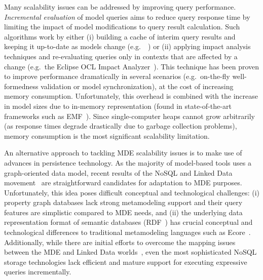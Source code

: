 Many scalability issues can be addressed by improving query performance. \emph{Incremental evaluation} of model queries aims to reduce query response time by limiting the impact of model modifications to query result calculation. Such algorithms work by either (i) building a cache of interim query results and keeping it up-to-date as models change (e.g.\ \eiq{}~\cite{models10}) or (ii) applying impact analysis techniques and re-evaluating queries only in contexts that are affected by a change (e.g.\ the Eclipse OCL Impact Analyzer~\cite{OCLIA}). This technique has been proven to improve performance dramatically in several scenarios (e.g.\ on-the-fly well-formedness validation or model synchronization), at the cost of increasing memory consumption. Unfortunately, this overhead is combined with the increase in model sizes due to in-memory representation (found in state-of-the-art frameworks such as EMF~\cite{EMF}). Since single-computer heaps cannot grow arbitrarily (as response times degrade drastically due to garbage collection problems), memory consumption is the most significant scalability limitation.%



An alternative approach to tackling MDE scalability issues is to make use of advances in persistence technology. As the majority of model-based tools uses a graph-oriented data model, recent results of the NoSQL and Linked Data movement~\cite{neo4j,openvirtuoso,sesame} are straightforward candidates for adaptation to MDE purposes. Unfortunately, this idea poses difficult conceptual and technological challenges: (i) property graph databases lack strong metamodeling support and their query features are simplistic compared to MDE needs, and (ii) the underlying data representation format of semantic databases (RDF~\cite{website:rdf_standard}) has crucial conceptual and technological differences to traditional metamodeling languages such as Ecore~\cite{EMF}. Additionally, while there are initial efforts to overcome the mapping issues between the MDE and Linked Data worlds~\cite{hillairet2008bridging}, even the most sophisticated NoSQL storage technologies lack efficient and mature support for executing expressive queries incrementally.


